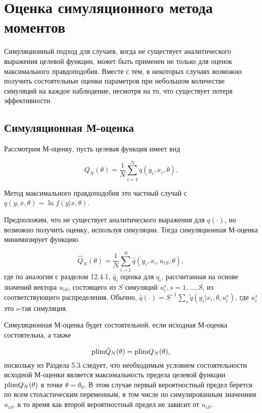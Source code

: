 \section{Оценка симуляционного метода моментов}

Симуляционный подход для случаев, когда не существует аналитического выражения целевой функции, может быть применен не только для оценок максимального правдоподобия. Вместе с тем, в некоторых случаях возможно получить состоятельные оценки параметров при небольшом количестве симуляций на каждое наблюдение, несмотря на то, что существует потеря эффективности.

\subsection{Симуляционная М-оценка}

Рассмотрим М-оценку, пусть целевая функция имеет вид

\[
Q_N(\theta)=\dfrac{1}{N}\sum^{N}_{i=1}q(y_i,x_i,\theta).
\]

Метод максимального правдоподобия это частный случай с $q(y,x,\theta)=\ln{f(y|x,\theta)}$.

Предположим, что не существует аналитического выражения для $q(\cdot)$, но возможно получить оценку, используя симуляции. Тогда симуляционная М-оценка минимизирует функцию

\begin{equation}
\hat{Q}_N(\theta)=\dfrac{1}{N}\sum^{N}_{i=1}\hat{q}(y_i,x_i,u_{iS},\theta),
\end{equation}
где по аналогии с разделом 12.4.1, $\hat{q}_i$ оценка для $q_i$, рассчитанная на основе значений вектора $u_{iS}$, состоящего из $S$ симуляций $u^{s}_i, s=1,\ldots ,S$, из соответствующего распределения. Обычно, $\hat{q}(\cdot)=S^{-1}\sum_{s}\tilde{q}(y_i|x_i,\theta,u^{s}_i)$, где $u^{s}_i$ это $s$-тая симуляция.

Симуляционная М-оценка будет состоятельной, если исходная М-оценка состоятельна, а также 

\begin{equation}
\mathrm{plim }\hat{Q}_N(\theta)=\mathrm{plim }{Q_N(\theta)},
\end{equation}
поскольку из Раздела 5.3 следует, что необходимым условием состоятельности исходной М-оценки является максимальность предела целевой функции $\mathrm{plim }{Q_N(\theta)}$ в точке $\theta=\theta_0$. В этом случае первый вероятностный предел берется по всем стохастическим переменным, в том числе по симулированным значениям $u_{iS}$, в то время как второй вероятностный предел не зависит от $u_{iS}$.


